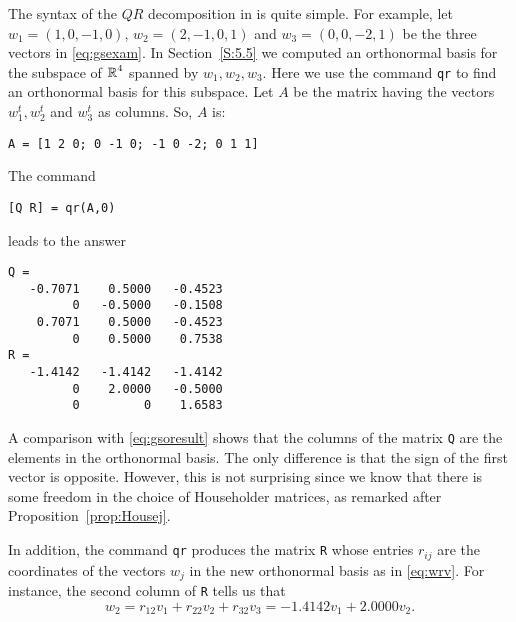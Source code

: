 \documentclass{ximera}
\begin{document}
The syntax of the $QR$ decomposition in \Matlab is quite simple.  For example,
let $w_1=(1,0,-1,0)$, $w_2=(2,-1,0,1)$ and $w_3=(0,0,-2,1)$ be the three
vectors in \eqref{eq:gsexam}.  In Section~\ref{S:5.5} we computed an orthonormal
basis for the subspace of $\mbox{$\Bbb{R}$}^4$ spanned by $w_1,w_2,w_3$.  Here we use the
\Matlab command {\tt qr} to find an orthonormal basis for this subspace.
Let $A$ be the matrix having the vectors $w_1^t,w_2^t$ and $w_3^t$
as columns.  So, $A$ is:
\begin{verbatim}
A = [1 2 0; 0 -1 0; -1 0 -2; 0 1 1]
\end{verbatim}
The command 
\begin{verbatim}
[Q R] = qr(A,0)
\end{verbatim}
leads to the answer
\begin{verbatim}
Q =
   -0.7071    0.5000   -0.4523
         0   -0.5000   -0.1508
    0.7071    0.5000   -0.4523
         0    0.5000    0.7538
R =
   -1.4142   -1.4142   -1.4142
         0    2.0000   -0.5000
         0         0    1.6583
\end{verbatim}
A comparison with \eqref{eq:gsoresult} shows that the columns of the matrix
{\tt Q} are the elements in the orthonormal basis.  The only difference
is that the sign of the first vector is opposite.  However, this is
not surprising since we know that there is some freedom in the choice of
Householder matrices, as remarked after Proposition~\ref{prop:Housej}.

In addition, the command {\tt qr} produces the matrix {\tt R} whose
entries $r_{ij}$ are the coordinates of the vectors $w_j$ in the
new orthonormal basis as in \eqref{eq:wrv}.  For instance, the second
column of {\tt R} tells us that
\[
w_2 = r_{12}v_1 + r_{22}v_2 + r_{32}v_3 = -1.4142 v_1 + 2.0000 v_2.
\]


\EXER

\TEXER
\end{document}

